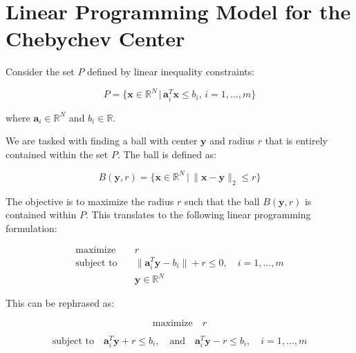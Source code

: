 \documentclass{article}
\begin{document}
\section*{Linear Programming Model for the Chebychev Center}

Consider the set \( P \) defined by linear inequality constraints:

\[
P = \{ \mathbf{x} \in \mathbb{R}^N \,|\, \mathbf{a}_i^T \mathbf{x} \leq b_i, \, i = 1, \ldots, m \}
\]

where \( \mathbf{a}_i \in \mathbb{R}^N \) and \( b_i \in \mathbb{R} \).

We are tasked with finding a ball with center \( \mathbf{y} \) and radius \( r \) that is entirely contained within the set \( P \). The ball is defined as:

\[
B(\mathbf{y}, r) = \{ \mathbf{x} \in \mathbb{R}^N \,|\, \|\mathbf{x} - \mathbf{y}\|_2 \leq r \}
\]

The objective is to maximize the radius \( r \) such that the ball \( B(\mathbf{y}, r) \) is contained within \( P \). This translates to the following linear programming formulation:

\begin{align*}
\text{maximize} & \quad r \\
\text{subject to} & \quad \|\mathbf{a}_i^T \mathbf{y} - b_i\| + r \leq 0, \quad i = 1, \ldots, m \\
& \quad \mathbf{y} \in \mathbb{R}^N
\end{align*}

This can be rephrased as:

\[
\text{maximize} \quad r
\]

\[
\text{subject to} \quad \mathbf{a}_i^T \mathbf{y} + r \leq b_i, \quad \text{and} \quad \mathbf{a}_i^T \mathbf{y} - r \leq b_i, \quad i = 1, \ldots, m
\]
\end{document}
